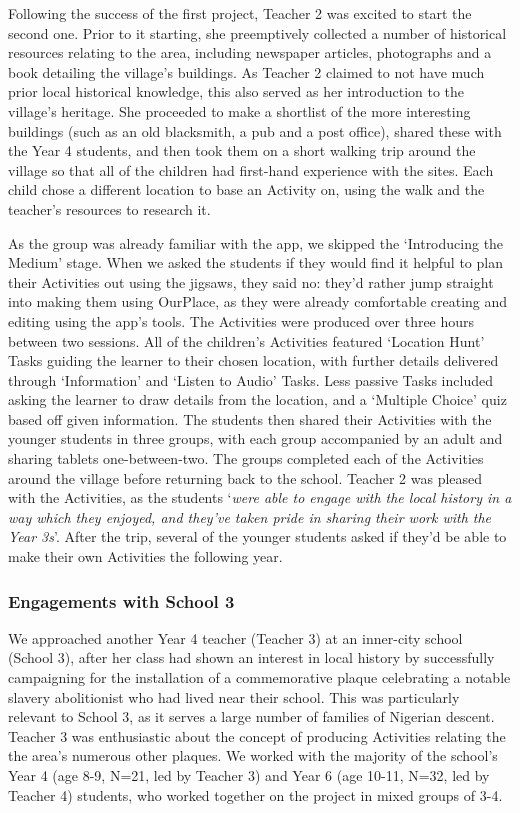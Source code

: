 \documentclass[,hyphens]{sigchi}
\begin{document}
Following the success of the first project, Teacher 2 was excited to start the second one. Prior to it starting, she preemptively collected a number of historical resources relating to the area, including newspaper articles, photographs and a book detailing the village's buildings. As Teacher 2 claimed to not have much prior local historical knowledge, this also served as her introduction to the village's heritage. She proceeded to make a shortlist of the more interesting buildings (such as an old blacksmith, a pub and a post office), shared these with the Year 4 students, and then took them on a short walking trip around the village so that all of the children had first-hand experience with the sites. Each child chose a different location to base an Activity on, using the walk and the teacher's resources to research it.

As the group was already familiar with the app, we skipped the `Introducing the Medium' stage. When we asked the students if they would find it helpful to plan their Activities out using the jigsaws, they said no: they'd rather jump straight into making them using OurPlace, as they were already comfortable creating and editing using the app's tools. The Activities were produced over three hours between two sessions. All of the children's Activities featured `Location Hunt' Tasks guiding the learner to their chosen location, with further details delivered through `Information' and `Listen to Audio' Tasks. Less passive Tasks included asking the learner to draw details from the location, and a `Multiple Choice' quiz based off given information. The students then shared their Activities with the younger students in three groups, with each group accompanied by an adult and sharing tablets one-between-two. The groups completed each of the Activities around the village before returning back to the school. Teacher 2 was pleased with the Activities, as the students `\textit{were able to engage with the local history in a way which they enjoyed, and they've taken pride in sharing their work with the Year 3s}'. After the trip, several of the younger students asked if they'd be able to make their own Activities the following year.

\subsubsection{Engagements with School 3}
We approached another Year 4 teacher (Teacher 3) at an inner-city school (School 3), after her class had shown an interest in local history by successfully campaigning for the installation of a commemorative plaque celebrating a notable slavery abolitionist who had lived near their school. This was particularly relevant to School 3, as it serves a large number of families of Nigerian descent. Teacher 3 was enthusiastic about the concept of producing Activities relating the the area's numerous other plaques. We worked with the majority of the school's Year 4 (age 8-9, N=21, led by Teacher 3) and Year 6 (age 10-11, N=32, led by Teacher 4) students, who worked together on the project in mixed groups of 3-4.
\end{document}
